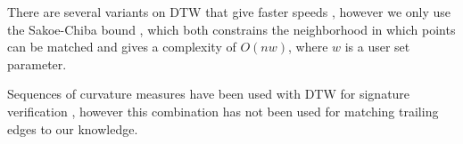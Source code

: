 There are several variants on DTW that give faster speeds \cite{salvador2007fastdtw} \cite{lemire2009faster}, however we only use the Sakoe-Chiba bound \cite{sakoe1978dynamic}, which both constrains the neighborhood in which points can be matched and gives a complexity of $O(nw)$, where $w$ is a user set parameter.

Sequences of curvature measures have been used with DTW for signature verification \cite{munich1999continuous}, however this combination has not been used for matching trailing edges to our knowledge.

